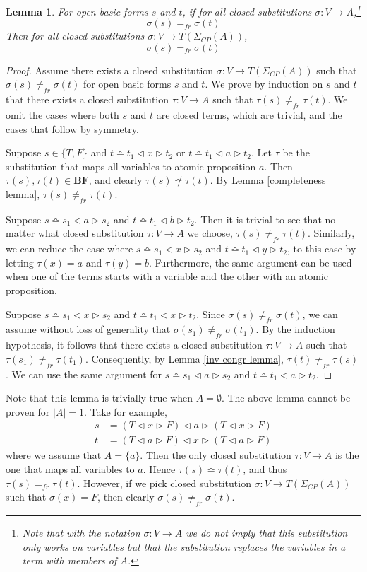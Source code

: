 \documentclass[a4paper,twoside,openright]{report}
\newcommand{\sig}{\ensuremath{\Sigma_{CP}(A)}}
\newcommand{\BF}{\ensuremath{\textbf{BF}}}
\newcommand{\syn}{\bumpeq}
\newcommand{\nsyn}{\not\bumpeq}
\newcommand{\lef}{\ensuremath{\triangleleft}}
\newcommand{\rig}{\ensuremath{\triangleright}}
\newtheorem{lem}[theorem]{Lemma}
\begin{document}
\begin{lem}\label{substitution lemma}
For open basic forms $s$ and $t$, if for all closed substitutions $\sigma:V\to A$,\footnote{Note that with the notation $\sigma:V\to A$ we do not imply that this substitution only works on variables but that the substitution replaces the variables in a term with members of $A$.}
\[
\sigma(s)=_{fr}\sigma(t)
\]
Then for all closed substitutions $\sigma:V\to T(\sig)$,
\[
\sigma(s)=_{fr}\sigma(t)
\]
\end{lem}
\begin{proof}
Assume there exists a closed substitution $\sigma:V\to T(\sig)$ such that $\sigma(s)\ne_{fr}\sigma(t)$ for open basic forms $s$ and $t$. We prove by induction on $s$ and $t$ that there exists a closed substitution $\tau:V\to A$ such that $\tau(s)\ne_{fr}\tau(t)$. We omit the cases where both $s$ and $t$ are closed terms, which are trivial, and the cases that follow by symmetry.

Suppose $s\in\{T,F\}$ and $t\syn t_1\lef x\rig t_2$ or $t\syn t_1\lef a\rig t_2$. Let $\tau$ be the substitution that maps all variables to atomic proposition $a$. Then $\tau(s),\tau(t)\in\BF$, and clearly $\tau(s)\nsyn\tau(t)$. By Lemma \ref{completeness lemma}, $\tau(s)\ne_{fr}\tau(t)$.

Suppose $s\syn s_1\lef a\rig s_2$ and $t\syn t_1\lef b\rig t_2$. Then it is trivial to see that no matter what closed substitution $\tau:V\to A$ we choose, $\tau(s)\ne_{fr}\tau(t)$. Similarly, we can reduce the case where $s\syn s_1\lef x\rig s_2$ and $t\syn t_1\lef y\rig t_2$, to this case by letting $\tau(x)=a$ and $\tau(y)=b$. Furthermore, the same argument can be used when one of the terms starts with a variable and the other with an atomic proposition.

Suppose $s\syn s_1\lef x\rig s_2$ and $t\syn t_1\lef x\rig t_2$. Since $\sigma(s)\ne_{fr}\sigma(t)$, we can assume without loss of generality that $\sigma(s_1)\ne_{fr}\sigma(t_1)$. By the induction hypothesis, it follows that there exists a closed substitution $\tau:V\to A$ such that $\tau(s_1)\ne_{fr}\tau(t_1)$. Consequently, by Lemma \ref{inv congr lemma}, $\tau(t)\ne_{fr}\tau(s)$. We can use the same argument for $s\syn s_1\lef a\rig s_2$ and $t\syn t_1\lef a\rig t_2$.
\end{proof}

Note that this lemma is trivially true when $A=\emptyset$. The above lemma cannot be proven for $|A|=1$. Take for example,
\begin{align*}
s &=(T\lef x\rig F)\lef a\rig(T\lef x\rig F)\\
t &=(T\lef a\rig F)\lef x\rig(T\lef a\rig F)
\end{align*}
where we assume that $A=\{a\}$. Then the only closed substitution $\tau:V\to A$ is the one that maps all variables to $a$. Hence $\tau(s)\syn\tau(t)$, and thus $\tau(s)=_{fr}\tau(t)$. However, if we pick closed substitution $\sigma:V\to T(\sig)$ such that $\sigma(x)=F$, then clearly $\sigma(s)\ne_{fr}\sigma(t)$.
\end{document}
